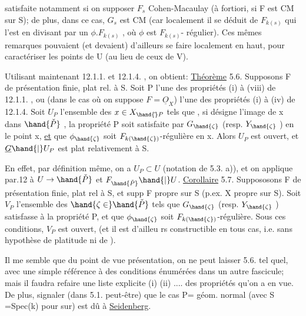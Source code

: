 
satisfaite notamment si on supposer $F_s$ Cohen-Macaulay (à fortiori, si
F est CM sur S); de plus, dans ce cas, $G_s$ est CM (car localement il se
déduit de $F_{k(s)}$ qui l'est en divisant par un $\phi . F_{k(s)}$ ,  où $\phi$ est $F_{k(s)}$-%
régulier). Ces mêmes remarques pouvaient (et devaient) d'ailleurs se faire localement
en haut, pour caractériser les points de U (au lieu de ceux de V).

Utilisant maintenant 12.1.1. et 12.1.4. , on obtient:
\uline{Théorème} 5.6. Supposons F de présentation finie, plat rel. à S. Soit
P l'une des propriétés 
 (i) à (viii) de 12.1.1. ,
ou  (dans le cas où on suppose $F=\underline{O}_X$) l'une des
 propriétés (i) à (iv)\hand{/} de 12.1.4. Soit
 $U_P$  l'ensemble des $x \in X_{\hand{\check{}}P}$ tels que , si \hand{$\zeta$}
 désigne l'image de x dans $\hand{\check{P}}$ , la propriété P soit satisfaite
par $G_{\hand{\zeta}}$ (resp.  $Y_{\hand{\zeta}}$ ) en le point x, \uline{et} que $\phi_{\hand{\zeta}}$ soit $F_{k(\hand{\zeta})}$-régulière en x.
Alors $U_P$ est ouvert, et $\underline{G}\hand{|}U_P$ est plat relativement à S.

En effet, par définition même, on a $U_P \subset U$ (notation de 5.3. a)),
et on applique par.12 à $U \to \hand{\check{P}}$ et $F_{\hand{\check{P}}}\hand{|}U$.
\uline{Corollaire} 5.7. Suppososons F de présentation finie, plat rel à S,
et supp F propre sur S (p.ex. X propre sur S). Soit $V_P$ l'ensemble des
$\hand{\zeta\in}\hand{\check{P}}$ tels que $G_{\hand{\zeta}}$ (resp. $Y_{\hand{\zeta}}$ ) satisfasse à la propriété P, et que $\phi_{\hand{\zeta}}$ soit
$F_{k(\hand{\zeta})}$-régulière. Sous ces conditions, $V_P$ est ouvert, (et il est d'ailleu
rs constructible en tous cas, i.e. sans hypothèse de platitude ni de
).

Il me semble que du point de vue présentation, on ne peut laisser
5.6. tel quel, avec une simple référence à des conditions énumérées dans
un autre fascicule; mais il faudra refaire une liste explicite (i) (ii)
.... des propriétés qu'on a en vue. De plus, signaler (dans 5.1. peut-être) que le cas P= géom.
normal (avec S =Spec(k) pour sur) est dû à \uline{Seidenberg}.

